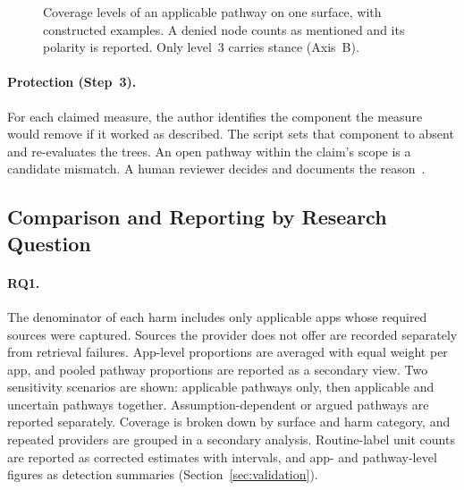 \begin{figure}[H]
\centering
{}
\caption[Coverage levels of a pathway]{Coverage levels of an applicable pathway on one
surface, with constructed examples. A denied node counts as mentioned and its polarity is
reported. Only level~3 carries stance (Axis~B).}
\label{fig:coverage-levels}
\end{figure}

\paragraph{Protection (Step~3).} For each claimed measure, the author identifies the component
the measure would remove if it worked as described. The script sets that component to absent and
re-evaluates the trees. An open pathway within the claim's scope is a candidate mismatch. A human
reviewer decides and documents the reason~\parencite[\S4.5]{knabenhans2026harms}.

\subsection{Comparison and Reporting by Research Question}
\label{sec:comparison}
\paragraph{RQ1.} The denominator of each harm includes only applicable apps whose required
sources were captured. Sources the provider does not offer are recorded separately from
retrieval failures. App-level proportions are averaged with equal weight per app, and pooled
pathway proportions are reported as a secondary view. Two sensitivity scenarios are shown:
applicable pathways only, then applicable and uncertain pathways together. Assumption-dependent
or argued pathways are reported separately. Coverage is broken down by surface and harm
category, and repeated providers are grouped in a secondary analysis. Routine-label unit counts
are reported as corrected estimates with intervals, and app- and pathway-level figures as
detection summaries (Section~\ref{sec:validation}).

